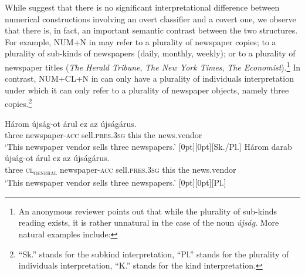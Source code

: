 \documentclass[output=paper]{langscibook}
\begin{document}
While \citet{schvarcz-rothstein-17} suggest that there is no significant interpretational difference between numerical constructions involving an overt classifier and a covert one, we observe that there is, in fact, an important semantic contrast between the two structures. For example, NUM+N in  may refer to a plurality of newspaper copies; to a plurality of sub-kinds of newspapers (daily, monthly, weekly); or to a plurality of newspaper titles (\textit{The Herald Tribune}, \textit{The New York Times}, \textit{The Economist}).\footnote{An anonymous reviewer points out that while the plurality of sub-kinds reading exists, it is rather unnatural in the case of the noun \textit{újság}. More natural examples include: 

\z

\z} In contrast, NUM+CL+N in  can only have a plurality of individuals interpretation under which it can only refer to a plurality of newspaper objects, namely three copies.\footnote{``Sk.'' stands for the subkind interpretation, ``Pl.'' stands for the plurality of individuals interpretation, ``K.'' stands for the kind interpretation.}

\ea \label{schv-nem:ex:8}
\ea \label{schv-nem:ex:8a}
\gll Három újság-ot árul ez az újságárus.\\
three newspaper-\textsc{acc} sell.\textsc{pres}.\textsc{3sg} this the news.vendor\\
\glt `This newspaper vendor sells three newspapers.'  \hfill \raisebox{2.3\baselineskip}[0pt][0pt]{[Sk./Pl.]}
\ex \label{schv-nem:ex:8b}
\gll Három darab újság-ot árul ez az újságárus.\\
three \textsc{cl\textsubscript{general}} newspaper-\textsc{acc} sell.\textsc{pres}.\textsc{3sg} this the news.vendor\\
\glt `This newspaper vendor sells three newspapers.'   \hfill \raisebox{2.3\baselineskip}[0pt][0pt]{[Pl.]}
\z
\z
\end{document}
